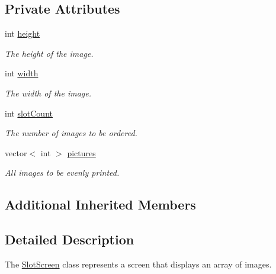 \subsection*{Private Attributes}
\begin{DoxyCompactItemize}
\item 
int \hyperlink{classSlotScreen_a332d1b2fc1c48b2c455cc276bf638891}{height}
\begin{DoxyCompactList}\small\item\em The height of the image. \end{DoxyCompactList}\item 
int \hyperlink{classSlotScreen_a04705a45598ba5e7db362913bedc12b9}{width}
\begin{DoxyCompactList}\small\item\em The width of the image. \end{DoxyCompactList}\item 
int \hyperlink{classSlotScreen_adc177088622711869c8ddec331058a78}{slot\-Count}
\begin{DoxyCompactList}\small\item\em The number of images to be ordered. \end{DoxyCompactList}\item 
vector$<$ int $>$ \hyperlink{classSlotScreen_adff0222578ff70c1362880d2a8bede80}{pictures}
\begin{DoxyCompactList}\small\item\em All images to be evenly printed. \end{DoxyCompactList}\end{DoxyCompactItemize}
\subsection*{Additional Inherited Members}


\subsection{Detailed Description}
The \hyperlink{classSlotScreen}{Slot\-Screen} class represents a screen that displays an array of images. 

